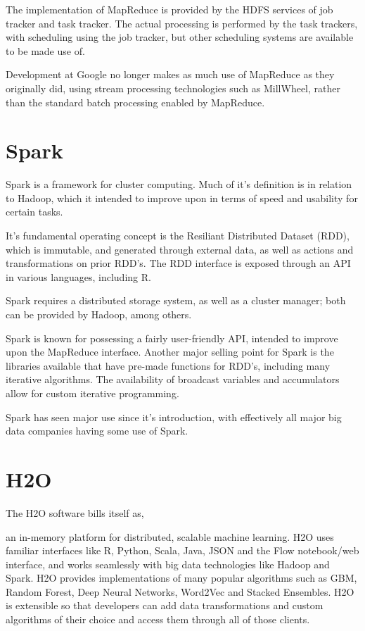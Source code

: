 \documentclass[10pt,a4paper]{article}
\begin{document}
The implementation of MapReduce is provided by the HDFS services of
job tracker and task tracker. The actual processing is performed by
the task trackers, with scheduling using the job tracker, but other
scheduling systems are available to be made use of.

Development at Google no longer makes as much use of MapReduce as they
originally did, using stream processing technologies such as
MillWheel, rather than the standard batch processing enabled by
MapReduce.

\section{Spark}
\label{sec:spark}
\nocite{zaharia2010spark}
\nocite{zaharia2016apache}
Spark is a framework for cluster computing. Much of it's definition is
in relation to Hadoop, which it intended to improve upon in terms of
speed and usability for certain tasks.

It's fundamental operating concept is the Resiliant Distributed
Dataset (RDD), which is immutable, and generated through external
data, as well as actions and transformations on prior RDD's. The RDD
interface is exposed through an API in various languages, including R.

Spark requires a distributed storage system, as well as a cluster
manager; both can be provided by Hadoop, among others.

Spark is known for possessing a fairly user-friendly API, intended to
improve upon the MapReduce interface. Another major selling point for
Spark is the libraries available that have pre-made functions for
RDD's, including many iterative algorithms. The availability of
broadcast variables and accumulators allow for custom iterative
programming.

Spark has seen major use since it's introduction, with effectively all
major big data companies having some use of Spark.

\section{H2O}
\label{sec:h2o}
\nocite{h2o.ai:_h2o}
\nocite{h2o.ai:_home_open_sourc_leader_ai}
The H2O software bills itself as,

\begin{displayquote}
  an in-memory platform for distributed, scalable machine learning.
  H2O uses familiar interfaces like R, Python, Scala, Java, JSON and
  the Flow notebook/web interface, and works seamlessly with big data
  technologies like Hadoop and Spark. H2O provides implementations of
  many popular algorithms such as GBM, Random Forest, Deep Neural
  Networks, Word2Vec and Stacked Ensembles. H2O is extensible so that
  developers can add data transformations and custom algorithms of
  their choice and access them through all of those clients.
\end{displayquote}
\end{document}
